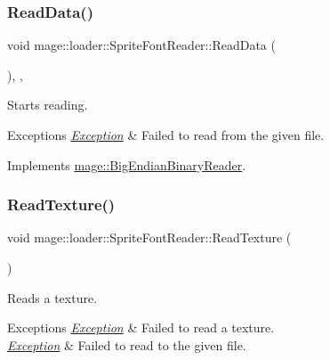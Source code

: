 \subsubsection{\texorpdfstring{Read\+Data()}{ReadData()}}
{\footnotesize\ttfamily void mage\+::loader\+::\+Sprite\+Font\+Reader\+::\+Read\+Data (\begin{DoxyParamCaption}{ }\end{DoxyParamCaption})\hspace{0.3cm}{\ttfamily [override]}, {\ttfamily [private]}, {\ttfamily [virtual]}}

Starts reading.


\begin{DoxyExceptions}{Exceptions}
{\em \hyperlink{classmage_1_1_exception}{Exception}} & Failed to read from the given file. \\
\hline
\end{DoxyExceptions}


Implements \hyperlink{classmage_1_1_big_endian_binary_reader_a7dc0689d598fa91308597b129516a11d}{mage\+::\+Big\+Endian\+Binary\+Reader}.

\hypertarget{classmage_1_1loader_1_1_sprite_font_reader_a4c95a43ec8017114981cf9817fd7e4af}{}\label{classmage_1_1loader_1_1_sprite_font_reader_a4c95a43ec8017114981cf9817fd7e4af} 
\subsubsection{\texorpdfstring{Read\+Texture()}{ReadTexture()}}
{\footnotesize\ttfamily void mage\+::loader\+::\+Sprite\+Font\+Reader\+::\+Read\+Texture (\begin{DoxyParamCaption}{ }\end{DoxyParamCaption})\hspace{0.3cm}{\ttfamily [private]}}

Reads a texture.


\begin{DoxyExceptions}{Exceptions}
{\em \hyperlink{classmage_1_1_exception}{Exception}} & Failed to read a texture. \\
\hline
{\em \hyperlink{classmage_1_1_exception}{Exception}} & Failed to read to the given file. \\
\hline
\end{DoxyExceptions}


